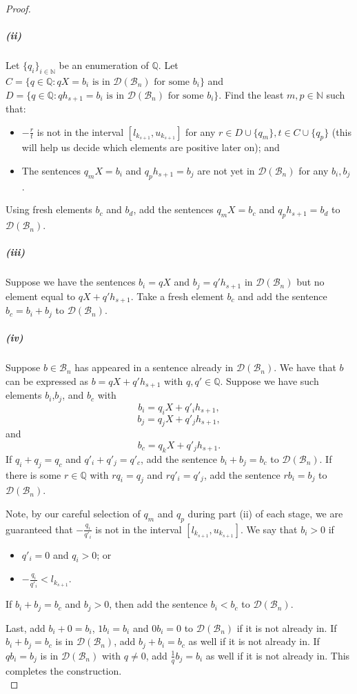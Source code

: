 \documentclass{amsart}%
\numberwithin{theorem}{section}
\newcommand{\Q}{\mathbb{Q}}
\newcommand{\N}{\mathbb{N}}
\newcommand{\B}{\mathcal{B}}
\newcommand{\D}{\mathcal{D}}
\newcommand{\0}{\emptyset}
\begin{document}
\begin{proof}
\subparagraph{(ii)} Let $\{q_i\}_{i\in \N}$ be an enumeration of $\Q$. Let $C=\{q\in \Q: qX=b_i \text{ is in $\D(\B_n)$ for some $b_i$} \}  $ and $D=\{q\in \Q: qh_{s+1}=b_i \text{ is in $\D(\B_n)$ for some $b_i$} \}  $. Find the least $m,p\in \N$ such that:
\begin{itemize}
    \item $-\frac{r}{t}$ is not in the interval $[l_{{k_{s+1}}}, u_{k_{s+1}}]$ for any $r\in D\cup \{q_m\}, t\in C\cup \{q_p\}$ (this will help us decide which elements are positive later on); and
    \item The sentences $q_mX=b_i$ and $q_p h_{s+1}= b_j$ are not yet in $\D(\B_n)$ for any $b_i,b_j$.
\end{itemize}
 Using fresh elements $b_c$ and $b_d$, add the sentences $q_mX=b_c$ and $q_p h_{s+1}=b_d$ to $\D(\B_n)$.\\

\subparagraph{(iii)} Suppose we have the sentences $b_i=qX$ and $b_j=q'h_{s+1}$ in $\D(\B_n)$ but no element equal to $qX + q'h_{s+1}$. Take a fresh element $b_c$ and add the sentence $b_c=b_i + b_j
$ to $\D(\B_n)$.\\

\subparagraph{(iv)} Suppose $b\in \B_n$ has appeared in a sentence already in $\D(\B_n)$. We have that $b$ can be expressed as $b=qX + q'h_{s+1}$ with $q,q'\in \Q$. Suppose we have such elements $b_i$,$b_j$, and $b_c$ with $$b_i=q_iX + q'_ih_{s+1}, $$
 $$b_j=q_jX + q'_jh_{s+1}, $$
and
$$b_c=q_kX + q'_jh_{s+1}. $$
If $q_i + q_j = q_c$ and $q'_i+q'_j=q'_c$, add the sentence $b_i+b_j=b_c$ to $\D(\B_n)$. If there is some $r\in \Q$ with $rq_i =q_j$ and $rq'_i=q'_j$, add the sentence $rb_i=b_j$ to $\D(\B_n)$. 

Note, by our careful selection of $q_m$ and $q_p$ during part (ii) of each stage, we are guaranteed that $-\frac{q_i}{q'_i}$ is not in the interval $[l_{{k_{s+1}}},u_{k_{s+1}}]$.  We say that $b_i>0$ if 
\begin{itemize}
    \item $q'_i=0$ and $q_i>0$; or
    \item $-\frac{q_i}{q'_i}<l_{k_{s+1}}$. 
\end{itemize}
If $b_i + b_j= b_c$ and $b_j>0$, then add the sentence $b_i<b_c$ to $\D(\B_n)$. 

Last, add $b_i+ 0 = b_i$, $1b_i=b_i$ and $0b_i= 0$ to $\D(\B_n)$ if it is not already in. If $b_i+b_j=b_c$ is in $\D(\B_n)$, add $b_j + b_i = b_c$ as well if it is not already in. If $qb_i=b_j$ is in $\D(\B_n)$ with $q\neq 0$, add $\frac{1}{q}b_j=b_i$ as well if it is not already in. This completes the construction.\\


\end{proof}
\end{document}
